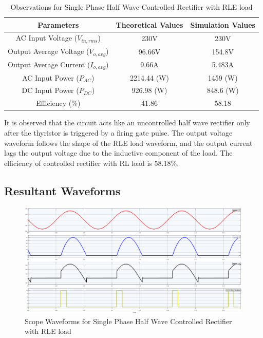 \begin{table}[h]
    \renewcommand{\arraystretch}{1.3}
    \label{table_observation_7}
    \centering
    \begin{tabular}{|c|c|c|}
        \hline
        Parameters                              & Theoretical Values & Simulation Values \\
        \hline
        \hline
        AC Input Voltage ($ V_{in,rms} $)       & 230V               & 230V              \\
        \hline
        Output Average Voltage ($ V_{o,avg} $)  & 96.66V             & 154.8V            \\
        \hline
        Output Average Current ($ I_{o,avg}  $) & 9.66A              & 5.483A            \\
        \hline
        AC Input Power ($ P_{AC}  $)            & 2214.44 (W)        & 1459 (W)          \\
        \hline
        DC Input Power ($ P_{DC}  $)            & 926.98 (W)         & 848.6 (W)         \\
        \hline
        Efficiency (\%)                         & 41.86              & 58.18             \\
        \hline
    \end{tabular}
    \caption{Observations for Single Phase Half Wave Controlled Rectifier with RLE load}

\end{table}


It is observed that the circuit acts like an uncontrolled half wave rectifier only after the thyristor is triggered by a firing gate pulse. The output voltage waveform follows the shape of the RLE load waveform, and the output current lags the output voltage due to the inductive component of the load.
The efficiency of controlled rectifier with RL load is 58.18\%.





\subsection{Resultant Waveforms}

\begin{figure}[h]
    \centering
    \includegraphics[width=1\textwidth]{images/experiment-1/circuit-scope-simulation-07.png}
    \caption{Scope Waveforms for Single Phase Half Wave Controlled Rectifier with RLE load}
    \label{Fig_waveform_single-phase-half-wave-controlled-rectifier-with-RLE-load}
\end{figure}


\pagebreak

